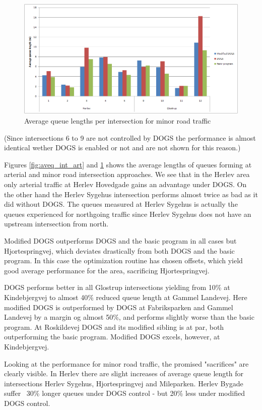 \begin{figure}[ht]
\centering
\includegraphics[scale=0.30]{aveq_intersection_crossing.png}
\caption{Average queue lengths per intersection for minor road traffic}
\label{fig:aveq_int_cross}
\end{figure}

(Since intersections 6 to 9 are not controlled by DOGS the performance is almost identical wether DOGS is enabled or not and are not shown for this reason.)

Figures \ref{fig:aveq_int_art} and \ref{fig:aveq_int_cross} shows the average lengths of queues forming at arterial and  minor road intersection approaches. We see that in the Herlev area only arterial traffic at Herlev Hovedgade gains an advantage under DOGS. On the other hand the Herlev Sygehus intersection performs almost twice as bad as it did without DOGS. The queues measured at Herlev Sygehus is actually the queues experienced for northgoing traffic since Herlev Sygehus does not have an upstream intersection from north.

Modified DOGS outperforms DOGS and the basic program in all cases but Hjortespringvej, which deviates drastically from both DOGS and the basic program. In this case the optimization routine has chosen offsets, which yield good average performance for the area, sacrificing Hjortespringvej.

DOGS performs better in all Glostrup intersections yielding from 10\% at Kindebjergvej to almost 40\% reduced queue length at Gammel Landevej. Here modified DOGS is outperformed by DOGS at Fabriksparken and Gammel Landevej by a margin og almost 50\%, and performs slightly worse than the basic program. At Roskildevej DOGS and its modified sibling is at par, both outperforming the basic program. Modified DOGS excels, however, at Kindebjergvej.

Looking at the performance for minor road traffic, the promised "sacrifices" are clearly visible. In Herlev there are slight increases of average queue length for intersections Herlev Sygehus, Hjortespringvej and Mileparken. Herlev Bygade suffer ~30\% longer queues under DOGS control - but 20\% less under modified DOGS control.

